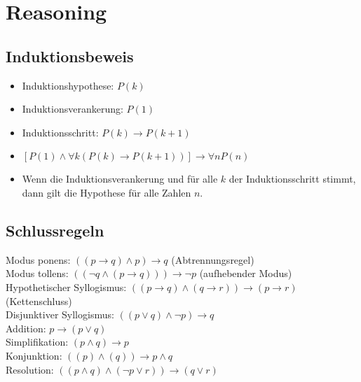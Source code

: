 \section{Reasoning}

\subsection{Induktionsbeweis}

\begin{itemize}
    \item{Induktionshypothese: $P(k)$}
    \item{Induktionsverankerung: $P(1)$}
    \item{Induktionsschritt: $P(k) \to P(k+1)$}
    \item{$[P(1) \land \forall k (P(k) \to P(k+1))] \to \forall n P(n)$}
    \item{Wenn die Induktionsverankerung und für alle $k$ der Induktionsschritt stimmt, dann gilt die Hypothese für alle Zahlen $n$.}
\end{itemize}

\subsection{Schlussregeln}

Modus ponens: $((p \to q) \land p) \to q$ (Abtrennungsregel)
\\
Modus tollens: $((\neg q \land (p \to q))) \to \neg p$ (aufhebender Modus)
\\
Hypothetischer Syllogismus: $((p \to q) \land (q \to r)) \to (p \to r)$ (Kettenschluss)
\\
Disjunktiver Syllogismus: $((p \lor q) \land \neg p) \to q$
\\
Addition: $p \to (p \lor q)$
\\
Simplifikation: $(p \land q) \to p$
\\
Konjunktion: $((p) \land (q)) \to p \land q$
\\
Resolution: $((p \land q) \land (\neg p \lor r)) \to (q \lor r)$
